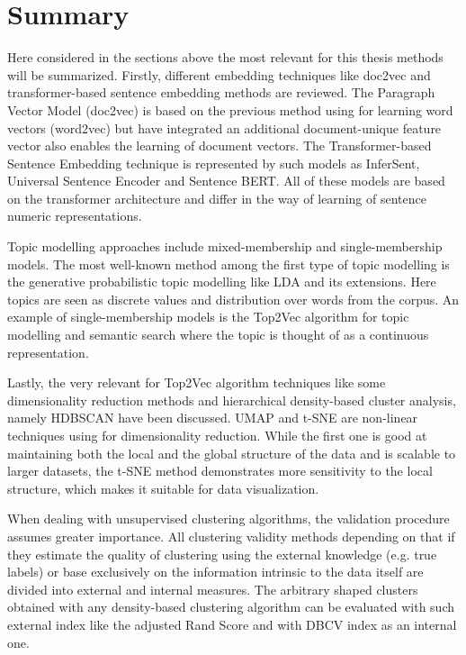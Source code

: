 \documentclass[fontsize=12pt,a4paper,twoside,openany]{scrbook}
\begin{document}
\section{Summary}
Here considered in the sections above the most relevant for this thesis methods will be summarized. Firstly, different embedding techniques like doc2vec and transformer-based sentence embedding methods are reviewed. The Paragraph Vector Model (doc2vec) is based on the previous method using for learning word vectors (word2vec) but have integrated an additional document-unique feature vector also enables the learning of document vectors. The Transformer-based Sentence Embedding technique is represented by such models as InferSent, Universal Sentence Encoder and Sentence BERT. All of these models are based on the transformer architecture and differ in the way of learning of sentence numeric representations.

Topic modelling approaches include mixed-membership and single-membership models. The most well-known method among the first type of topic modelling is the generative probabilistic topic modelling like LDA and its extensions. Here topics are seen as discrete values and distribution over words from the corpus. An example of single-membership models is the Top2Vec algorithm for topic modelling and semantic search where the topic is thought of as a continuous representation.

Lastly, the very relevant for Top2Vec algorithm techniques like some dimensionality reduction methods and hierarchical density-based cluster analysis, namely HDBSCAN have been discussed. UMAP and t-SNE are non-linear techniques using for dimensionality reduction. While the first one is good at maintaining both the local and the global structure of the data and is scalable to larger datasets, the t-SNE method demonstrates more sensitivity to the local structure, which makes it suitable for data visualization. 

When dealing with unsupervised clustering algorithms, the validation procedure assumes greater importance. All clustering validity methods depending on that if they estimate the quality of clustering using the external knowledge (e.g. true labels) or base exclusively on the information intrinsic to the data itself are divided into external and internal measures. The arbitrary shaped clusters obtained with any density-based clustering algorithm can be evaluated with such external index like the adjusted Rand Score and with DBCV index as an internal one.
\end{document}

